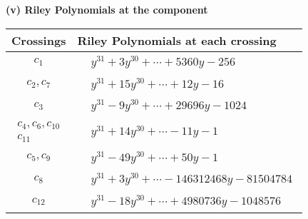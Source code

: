 \documentclass[1p]{elsarticle_modified}
\theoremstyle{definition}
\begin{document}
\newpage\renewcommand{\arraystretch}{1}
\flushleft \textbf{(v) Riley Polynomials at the component}\newline \\
\begin{tabular}{m{50pt}|m{274pt}}
Crossings & \hspace{64pt}Riley Polynomials at each crossing \\
\hline $$\begin{aligned}c_{1}\end{aligned}$$&$\begin{aligned}
&y^{31}+3 y^{30}+\cdots+5360 y-256
\end{aligned}$\\
\hline $$\begin{aligned}c_{2},c_{7}\end{aligned}$$&$\begin{aligned}
&y^{31}+15 y^{30}+\cdots+12 y-16
\end{aligned}$\\
\hline $$\begin{aligned}c_{3}\end{aligned}$$&$\begin{aligned}
&y^{31}-9 y^{30}+\cdots+29696 y-1024
\end{aligned}$\\
\hline $$\begin{aligned}c_{4},c_{6},c_{10}\\c_{11}\end{aligned}$$&$\begin{aligned}
&y^{31}+14 y^{30}+\cdots-11 y-1
\end{aligned}$\\
\hline $$\begin{aligned}c_{5},c_{9}\end{aligned}$$&$\begin{aligned}
&y^{31}-49 y^{30}+\cdots+50 y-1
\end{aligned}$\\
\hline $$\begin{aligned}c_{8}\end{aligned}$$&$\begin{aligned}
&y^{31}+3 y^{30}+\cdots-146312468 y-81504784
\end{aligned}$\\
\hline $$\begin{aligned}c_{12}\end{aligned}$$&$\begin{aligned}
&y^{31}-18 y^{30}+\cdots+4980736 y-1048576
\end{aligned}$\\
\hline
\end{tabular}\\~\\
\end{document}
